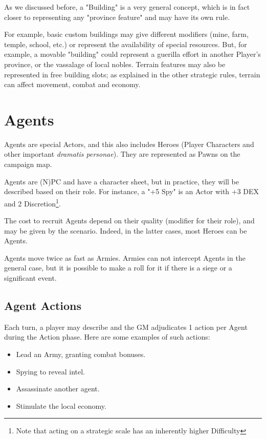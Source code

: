 As we discussed before, a "Building" is a very general concept, which is in fact closer to representing any "province feature" and may have its own rule.

For example, basic custom buildings may give different modifiers (mine, farm, temple, school, etc.) or represent the availability of special resources. But, for example, a movable "building" could represent a guerilla effort in another Player's province, or the vassalage of local nobles. Terrain features may also be represented in free building slots; as explained in the other strategic rules, terrain can affect movement, combat and economy.

\section{Agents}

\label{agents}

Agents are special Actors, and this also includes Heroes (Player Characters and other important \textit{dramatis personae}). They are represented as Pawns on the campaign map.

Agents are (N)PC and have a character sheet, but in practice, they will be described based on their role. For instance, a "+5 Spy" is an Actor with +3 DEX and 2 Discretion\footnote{Note that acting on a strategic scale has an inherently higher Difficulty}.

The cost to recruit Agents depend on their quality (modifier for their role), and may be given by the scenario. Indeed, in the latter cases, most Heroes can be Agents.

Agents move twice as fast as Armies. Armies can not intercept Agents in the general case, but it is possible to make a roll for it if there is a siege or a significant event.

\subsection{Agent Actions}

Each turn, a player may describe and the GM adjudicates 1 action per Agent during the Action phase. Here are some examples of such actions: 

\begin{itemize}
    \item Lead an Army, granting combat bonuses.
    \item Spying to reveal intel.
    \item Assassinate another agent.
    \item Stimulate the local economy.
\end{itemize}

